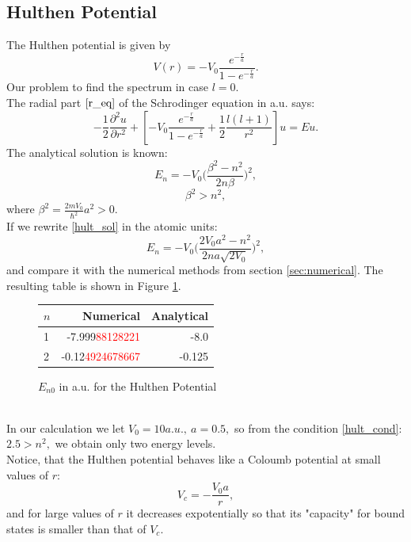 \documentclass[a4paper, 12pt]{article}
\begin{document}
\subsection{Hulthen Potential}
The Hulthen potential is given by
\begin{equation}
    V(r) = - V_0 \frac{e^{-\frac{r}{a}}}{1 - e^{-\frac{r}{a}}}.
\end{equation}
Our problem to find the spectrum in case $l=0.$\\
The radial part $\eqref{r_eq}$ of the Schrodinger equation in a.u.  says:
$$-\frac{1}{2}\frac{\partial^2 u}{\partial r^2}+[- V_0 \frac{e^{-\frac{r}{a}}}{1 - e^{-\frac{r}{a}}} +\frac{1}{2}\frac{l(l+1)}{r^2}]u = Eu.$$
The analytical solution is known:
\begin{equation}\label{hult_sol}
	E_n = -V_0\bigg(\frac{\beta^2 - n^2}{2n\beta}\bigg)^2,
\end{equation}
\begin{equation}\label{hult_cond}
	\beta^2 > n^2, 
\end{equation}
where $\beta^2 = \displaystyle{\frac{2m V_0}{\hbar^2}a^2} > 0.$\\
If we rewrite \eqref{hult_sol} in the atomic units:
$$E_n = -V_0\bigg(\frac{2 V_0 a^2 - n^2}{2n a \sqrt{2V_0}}\bigg)^2,$$
and compare it with the numerical methods from section  \ref{sec:numerical}.  The resulting table is shown in Figure \ref{fig:Hult_spectrum}.
\begin{figure}[h!]
\centering
\begin{tabular}{lrr}
\toprule
\centering
$n$ &         Numerical &         Analytical \\
\midrule
1 & -7.999\textcolor{red}{88128221} & -8.0 \\
2 & -0.12\textcolor{red}{4924678667} & -0.125 \\
\bottomrule
\end{tabular}
\caption{$E_{n0}$ in a.u. for the Hulthen Potential}
\label{fig:Hult_spectrum}
\end{figure}\\
In our calculation we let $V_0 = 10 a.u.,~a = 0.5,$ so from the condition \ref{hult_cond}: $2.5 > n^2,$ we obtain only two energy levels.\\
Notice, that the Hulthen potential behaves like  a Coloumb potential at small values of $r:$
$$V_c = -\frac{V_0 a}{r},$$
and for large values of $r$ it decreases expotentially so that its "capacity" for bound states is smaller than that of $V_c.$
\end{document}
